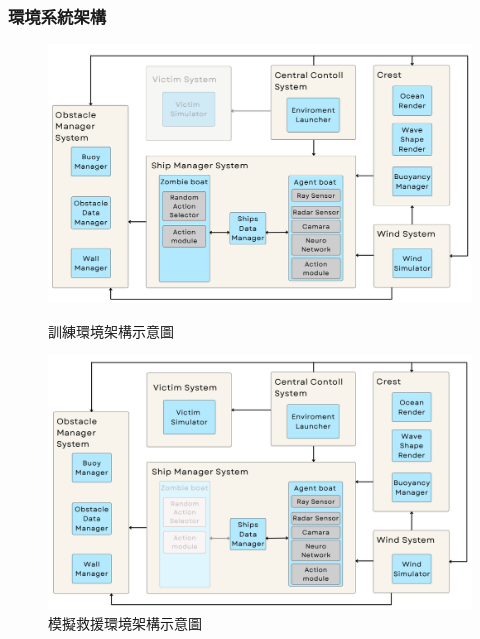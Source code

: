 \documentclass[12pt,a4paper]{article}
\begin{document}
\newpage

\subsubsection{環境系統架構}
\begin{figure}[h]
    \centering
    \includegraphics[scale=0.381]{image/TrainingArchitecture.png}
    \caption{訓練環境架構示意圖}
    \label{fig:training_env}

	\vspace*{0.3cm}

    \includegraphics[scale=0.381]{image/SimulationArchitecture.png}
    \caption{模擬救援環境架構示意圖}
    \label{fig:simulation_env}
\end{figure}



\newpage
\end{document}
